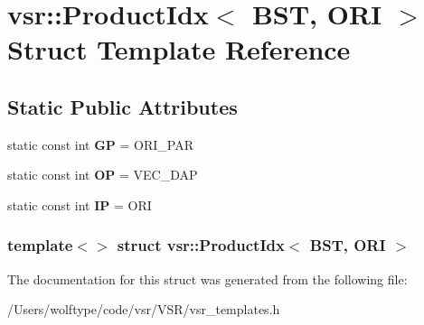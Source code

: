 \hypertarget{structvsr_1_1_product_idx_3_01_b_s_t_00_01_o_r_i_01_4}{\section{vsr\-:\-:Product\-Idx$<$ B\-S\-T, O\-R\-I $>$ Struct Template Reference}
\label{structvsr_1_1_product_idx_3_01_b_s_t_00_01_o_r_i_01_4}
}
\subsection*{Static Public Attributes}
\begin{DoxyCompactItemize}
\item 
\hypertarget{structvsr_1_1_product_idx_3_01_b_s_t_00_01_o_r_i_01_4_abc9445582ac6c46337a4464251609166}{static const int {\bfseries G\-P} = O\-R\-I\-\_\-\-P\-A\-R}\label{structvsr_1_1_product_idx_3_01_b_s_t_00_01_o_r_i_01_4_abc9445582ac6c46337a4464251609166}

\item 
\hypertarget{structvsr_1_1_product_idx_3_01_b_s_t_00_01_o_r_i_01_4_a8a35cfcfe61cb4182b57cdd6c0e436ac}{static const int {\bfseries O\-P} = V\-E\-C\-\_\-\-D\-A\-P}\label{structvsr_1_1_product_idx_3_01_b_s_t_00_01_o_r_i_01_4_a8a35cfcfe61cb4182b57cdd6c0e436ac}

\item 
\hypertarget{structvsr_1_1_product_idx_3_01_b_s_t_00_01_o_r_i_01_4_a72c0a122f160afa3e5d2786e2cc22a77}{static const int {\bfseries I\-P} = O\-R\-I}\label{structvsr_1_1_product_idx_3_01_b_s_t_00_01_o_r_i_01_4_a72c0a122f160afa3e5d2786e2cc22a77}

\end{DoxyCompactItemize}
\subsubsection*{template$<$$>$ struct vsr\-::\-Product\-Idx$<$ B\-S\-T, O\-R\-I $>$}



The documentation for this struct was generated from the following file\-:\begin{DoxyCompactItemize}
\item 
/\-Users/wolftype/code/vsr/\-V\-S\-R/vsr\-\_\-templates.\-h\end{DoxyCompactItemize}

